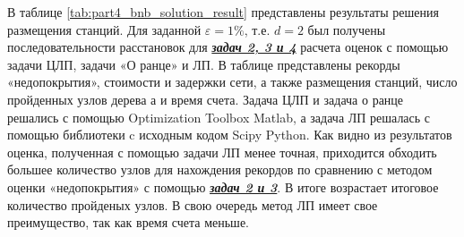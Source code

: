 В таблице \cref{tab:part4_bnb_solution_result} представлены результаты решения размещения станций. Для заданной $\varepsilon=1\%$, т.е. $d=2$ был получены последовательности расстановок для \underline{\textit{\textbf{задач 2, 3 и 4}}} расчета оценок с помощью задачи ЦЛП, задачи «О ранце» и ЛП. В таблице представлены рекорды «недопокрытия», стоимости и задержки сети, а также размещения станций, число пройденных узлов дерева а и время счета.
Задача ЦЛП и задача о ранце решались с помощью Optimization Toolbox Matlab, а задача ЛП решалась с помощью библиотеки c исходным кодом Scipy Python. Как видно из результатов оценка, полученная с помощью задачи ЛП менее точная, приходится обходить большее количество узлов для нахождения рекордов по сравнению с методом оценки «недопокрытия» с помощью \underline{\textit{\textbf{задач 2 и 3}}}. В итоге возрастает итоговое количество пройденых узлов. В свою очередь метод ЛП имеет свое преимущество, так как время счета меньше.


